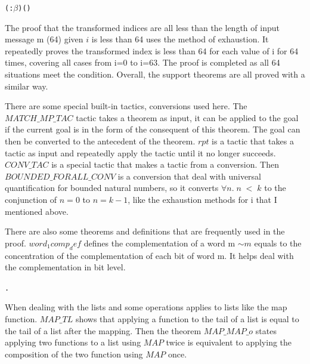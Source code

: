 \documentclass{article}
\begin{document}
\begin{alltt}
   \HOLTokenTurnstile{}  \HOLSymConst{\HOLTokenLt{}}  (:\ensuremath{\beta}) \HOLSymConst{\HOLTokenImp{}} ()    \HOLSymConst{=}  
\end{alltt}

The proof that the transformed indices are all less than the length of input message m (64) given $i$ is less than 64 uses
the method of exhaustion. It repeatedly proves the transformed index is less than 64 for each value of i for 64 times, covering
all cases from i=0 to i=63. The proof is completed as all 64 situations meet the condition. Overall, the support theorems are
all proved with a similar way.

There are some special built-in tactics, conversions used here. The \\
$MATCH\_MP\_TAC$ tactic takes a theorem as input,
it can be applied to the goal if the current goal is in the form of the consequent of this theorem. The goal can then be
converted to the antecedent of the theorem. $rpt$ is a tactic that takes a tactic as input and repeatedly apply the tactic until
it no longer succeeds. $CONV\_TAC$ is a special tactic that makes a tactic from a conversion. Then $BOUNDED\_FORALL\_CONV$ is a
conversion that deal with universal quantification for bounded natural numbers, so it converts $\forall n. \;n \; < \; k$ to
the conjunction of $n=0$ to $n=k-1$, like the exhaustion methods for i that I mentioned above.

There are also some theorems and definitions that are frequently used in the proof. $word_1comp_def$ defines the complementation of a word m
$\sim m$ equals to the concentration of the complementation of each bit of word m. It helps deal with the complementation in
bit level.

\begin{alltt}
   \HOLTokenTurnstile{} \HOLSymConst{\HOLTokenNeg{}} \HOLSymConst{=}  . \HOLSymConst{\HOLTokenNeg{}}  
\end{alltt}

When dealing with the lists and some operations applies to lists like the map function. $MAP\_TL$ shows that applying a function
to the tail of a list is equal to the tail of a list after the mapping. Then the theorem $MAP\_MAP\_o$ states applying two functions
to a list using $MAP$ twice is equivalent to applying the composition of the two function using $MAP$ once.
\end{document}
